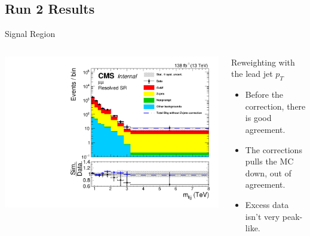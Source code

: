 \documentclass[aspectratio=169]{beamer}
\begin{document}
\begin{backup}
  \subsection{Run 2 Results}

  \begin{frame}{Signal Region}
    \begin{columns}
      \begin{column}{0.50\textwidth}
        \centering
        \includegraphics[width=\textwidth]{../figures/plots/mlljj-sr-mumu.pdf}
      \end{column}
      \begin{column}{0.50\textwidth}
          \centering
          \resizebox{0.55\columnwidth}{!}{%
          
          }
  
        \vfill
        
        \begin{block}{Reweighting with the lead jet $p_T$}
          \begin{itemize}
            \item Before the correction, there is good agreement.
            \item The corrections pulls the MC down, out of agreement.
            \item Excess data isn't very peak-like.
          \end{itemize}
        \end{block}
      \end{column}
    \end{columns}
  \end{frame}
  

\end{backup}
\end{document}
